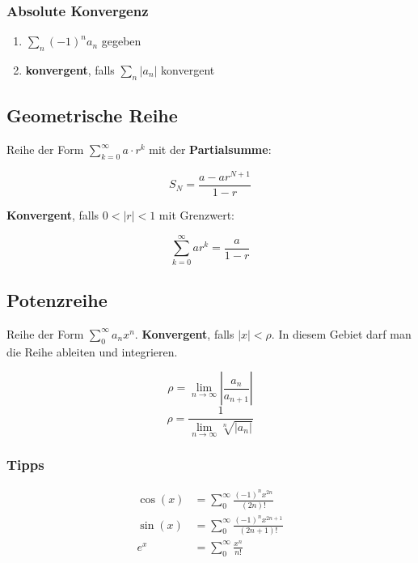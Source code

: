 \documentclass[11pt]{article}
\begin{document}
\subsubsection*{Absolute Konvergenz}

\begin{enumerate}
	\item $\sum_n (-1)^n a_n$ gegeben
	\item \textbf{konvergent}, falls $\sum_n |a_n|$ konvergent
\end{enumerate}

\subsection{Geometrische Reihe}

Reihe der Form $\sum^\infty_{k = 0} a \cdot r^k$ mit der \textbf{Partialsumme}:

\begin{equation*}
	S_N=\frac{a-ar^{N+1}}{1-r}
\end{equation*}

\textbf{Konvergent}, falls $0<|r|<1$ mit Grenzwert:

\begin{equation*}
	\sum^\infty_{k=0}ar^k=\frac{a}{1-r}
\end{equation*}

\subsection{Potenzreihe}

Reihe der Form $\sum^\infty_0 a_nx^n$. \textbf{Konvergent}, falls $|x|<\rho$. In diesem Gebiet darf man die Reihe ableiten und integrieren.

\begin{equation*}
	\rho= \lim_{n\rightarrow \infty}|\frac{a_n}{a_{n+1}}|
\end{equation*}
\begin{equation*}
	\rho=\frac{1}{\lim_{n\rightarrow \infty}\sqrt[n]{|a_n|}}
\end{equation*}

\subsubsection{Tipps}
\begin{equation*}
\begin{split}
	\cos(x) & = \sum^\infty_0\frac{(-1)^nx^{2n}}{(2n)!} \\
	\sin(x) & = \sum^\infty_0\frac{(-1)^nx^{2n+1}}{(2n+1)!} \\
	e^x & = \sum^\infty_0\frac{x^n}{n!}
\end{split}
\end{equation*}
\end{document}
